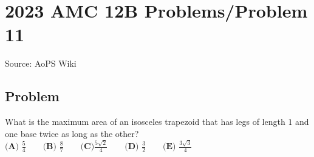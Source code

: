 \documentclass[12pt]{article}
\begin{document}
\section*{{2023 AMC 12B Problems/Problem 11}}
Source: AoPS Wiki

\subsection*{Problem}
What is the maximum area of an isosceles trapezoid that has legs of length $1$ and one base twice as long as the other? $\textbf{(A) }\frac 54 \qquad \textbf{(B) } \frac 87 \qquad \textbf{(C)} \frac{5\sqrt2}4 \qquad \textbf{(D) } \frac 32 \qquad \textbf{(E) } \frac{3\sqrt3}4$
\end{document}
